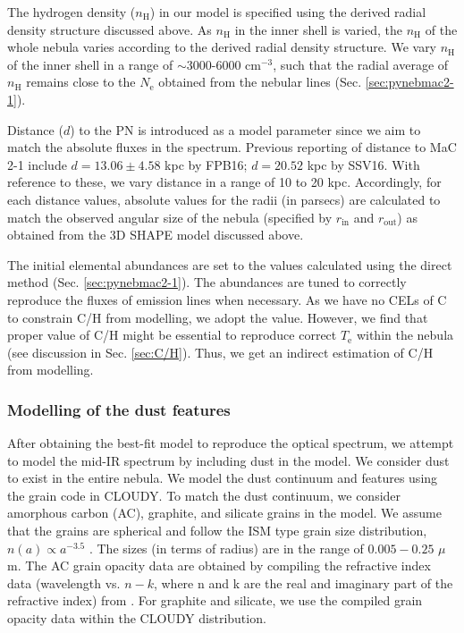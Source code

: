 \documentclass[a4paper,fleqn,usenatbib]{mnras}
\begin{document}
The hydrogen density ($n_\mathrm{H}$) in our model is specified using the derived radial density structure discussed above. As $n_\mathrm{H}$ in the inner shell is varied, the $n_\mathrm{H}$ of the whole nebula varies according to the derived radial density structure. We vary $n_\mathrm{H}$ of the inner shell in a range of $\sim$3000-6000 cm$^{-3}$, such that the radial average of $n_\mathrm{H}$ remains close to the $N_\mathrm{e}$ obtained from the nebular lines (Sec. \ref{sec:pynebmac2-1}).      
  
Distance ($d$) to the PN is introduced as a model parameter since we aim to match the absolute fluxes in the spectrum. Previous reporting of distance to MaC 2-1 include $d=13.06\pm4.58$ kpc by FPB16; $d=20.52$ kpc by SSV16. With reference to these, we vary distance in a range of 10 to 20 kpc. Accordingly, for each distance values, absolute values for the radii (in parsecs) are calculated to match the observed angular size of the nebula (specified by $r_\mathrm{in}$ and $r_\mathrm{out}$) as obtained from the 3D SHAPE model discussed above.       

The initial elemental abundances are set to the values calculated using the direct method (Sec. \ref{sec:pynebmac2-1}). The abundances are tuned to correctly reproduce the fluxes of emission lines when necessary. As we have no CELs of C to constrain C/H from modelling, we adopt the \citep{2010Ap&SS.328..179G} value. However, we find that proper value of C/H might be essential to reproduce correct $T_\mathrm{e}$ within the nebula (see discussion in Sec. \ref{sec:C/H}). Thus, we get an indirect estimation of C/H from modelling.  

\subsubsection{Modelling of the dust features}
After obtaining the best-fit model to reproduce the optical spectrum, we attempt to model the mid-IR spectrum by including dust in the model. We consider dust to exist in the entire nebula. We model the dust continuum and features using the grain code in CLOUDY. To match the dust continuum, we consider amorphous carbon (AC), graphite, and silicate grains in the model. We assume that the grains are spherical and follow the ISM type grain size distribution, $n(a)\propto{a^{-3.5}}$ \citep{1977ApJ...217..425M}. The sizes (in terms of radius) are in the range of $0.005-0.25$ $\mu$m. The AC grain opacity data are obtained by compiling the refractive index data (wavelength vs. $n-k$, where n and k are the real and imaginary part of the refractive index) from \citet{1991ApJ...377..526R}. For graphite and silicate, we use the compiled grain opacity data within the CLOUDY distribution.   
\end{document}
